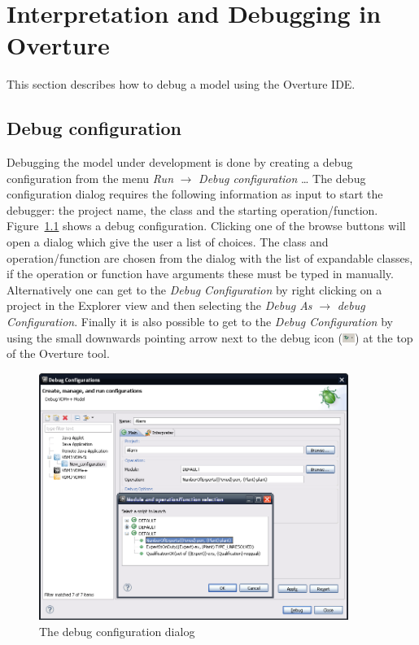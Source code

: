 \documentclass{overturerepchap}
\begin{document}
\chapter{Interpretation and Debugging in Overture}\label{sec:debug}

This section describes how to debug a model using the Overture IDE. 

\section{Debug configuration}

Debugging the model under development is done by creating a debug configuration
from the menu \emph{Run} $\rightarrow $ \emph{Debug configuration}
\ldots 
The debug
configuration dialog requires the following information as input to start the
debugger: the project name, the class and the starting operation/function.
Figure~\ref{fig:userguide:debugConfiguration} shows a debug configuration.
Clicking one of the browse buttons will open a dialog which give the user a list
of choices. The class and operation/function are chosen from the dialog with the
list of expandable classes, if the operation or function have arguments these
must be typed in manually. Alternatively one can get to the
\emph{Debug Configuration} by right clicking on a project in the
Explorer view and then selecting the \emph{Debug As} $\rightarrow$
\emph{debug Configuration}. Finally it is also possible to get to the
\emph{Debug Configuration} by using the small downwards pointing arrow
next to the debug icon
(\includegraphics[width=0.03\textwidth]{icons/debuggericon}) at the
top of the Overture tool. 

\begin{figure}[htp]
\begin{center}
  \includegraphics[width=380px]{figures/debugConfiguration}
  \caption{The debug configuration dialog}
  \label{fig:userguide:debugConfiguration}
\end{center}
\end{figure}
\end{document}
